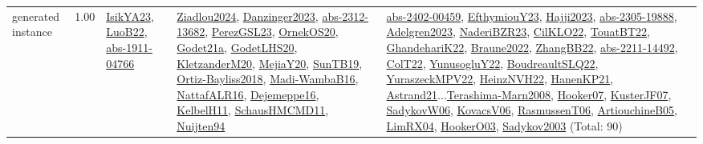 {\begin{longtable}{p{3cm}r>{\raggedright\arraybackslash}p{6cm}>{\raggedright\arraybackslash}p{6cm}>{\raggedright\arraybackslash}p{8cm}}
\index{generated instance}\index{Benchmarks!generated instance}generated instance &  1.00 & \hyperref[detail:IsikYA23]{IsikYA23}, \hyperref[detail:LuoB22]{LuoB22}, \hyperref[detail:abs-1911-04766]{abs-1911-04766} & \hyperref[detail:Ziadlou2024]{Ziadlou2024}, \hyperref[detail:Danzinger2023]{Danzinger2023}, \hyperref[detail:abs-2312-13682]{abs-2312-13682}, \hyperref[detail:PerezGSL23]{PerezGSL23}, \hyperref[detail:OrnekOS20]{OrnekOS20}, \hyperref[detail:Godet21a]{Godet21a}, \hyperref[detail:GodetLHS20]{GodetLHS20}, \hyperref[detail:KletzanderM20]{KletzanderM20}, \hyperref[detail:MejiaY20]{MejiaY20}, \hyperref[detail:SunTB19]{SunTB19}, \hyperref[detail:Ortiz-Bayliss2018]{Ortiz-Bayliss2018}, \hyperref[detail:Madi-WambaB16]{Madi-WambaB16}, \hyperref[detail:NattafALR16]{NattafALR16}, \hyperref[detail:Dejemeppe16]{Dejemeppe16}, \hyperref[detail:KelbelH11]{KelbelH11}, \hyperref[detail:SchausHMCMD11]{SchausHMCMD11}, \hyperref[detail:Nuijten94]{Nuijten94} & \hyperref[detail:abs-2402-00459]{abs-2402-00459}, \hyperref[detail:EfthymiouY23]{EfthymiouY23}, \hyperref[detail:Hajji2023]{Hajji2023}, \hyperref[detail:abs-2305-19888]{abs-2305-19888}, \hyperref[detail:Adelgren2023]{Adelgren2023}, \hyperref[detail:NaderiBZR23]{NaderiBZR23}, \hyperref[detail:CilKLO22]{CilKLO22}, \hyperref[detail:TouatBT22]{TouatBT22}, \hyperref[detail:GhandehariK22]{GhandehariK22}, \hyperref[detail:Braune2022]{Braune2022}, \hyperref[detail:ZhangBB22]{ZhangBB22}, \hyperref[detail:abs-2211-14492]{abs-2211-14492}, \hyperref[detail:ColT22]{ColT22}, \hyperref[detail:YunusogluY22]{YunusogluY22}, \hyperref[detail:BoudreaultSLQ22]{BoudreaultSLQ22}, \hyperref[detail:YuraszeckMPV22]{YuraszeckMPV22}, \hyperref[detail:HeinzNVH22]{HeinzNVH22}, \hyperref[detail:HanenKP21]{HanenKP21}, \hyperref[detail:Astrand21]{Astrand21}...\hyperref[detail:Terashima-Marn2008]{Terashima-Marn2008}, \hyperref[detail:Hooker07]{Hooker07}, \hyperref[detail:KusterJF07]{KusterJF07}, \hyperref[detail:SadykovW06]{SadykovW06}, \hyperref[detail:KovacsV06]{KovacsV06}, \hyperref[detail:RasmussenT06]{RasmussenT06}, \hyperref[detail:ArtiouchineB05]{ArtiouchineB05}, \hyperref[detail:LimRX04]{LimRX04}, \hyperref[detail:HookerO03]{HookerO03}, \hyperref[detail:Sadykov2003]{Sadykov2003} (Total: 90)\\

\end{longtable}}
